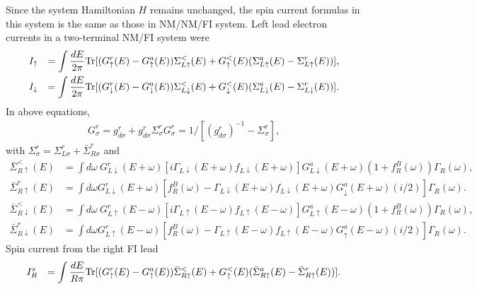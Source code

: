 \documentclass[aps,prb,superscriptaddress]{revtex4-2}
\begin{document}
Since the system Hamiltonian $H$ remains unchanged, the spin current formulas in this system is the same as those in NM/NM/FI system. Left lead electron currents in a two-terminal NM/FI system were
\begin{eqnarray}
I_{\uparrow} &&= \int \frac{dE}{2\pi} {\rm Tr} [(G_{\uparrow}^r(E)-G_{\uparrow}^a(E))\Sigma^<_{L\uparrow}(E)+G_{\uparrow}^<(E) (\Sigma_{L\uparrow}^a(E) -\Sigma_{L\uparrow}^r(E))],\\
I_{\downarrow} &&= \int \frac{dE}{2\pi} {\rm Tr} [(G_{\downarrow}^r(E)-G_{\downarrow}^a(E))\Sigma^<_{L\downarrow}(E)+G_{\downarrow}^<(E) (\Sigma_{L\downarrow}^a(E) -\Sigma_{L\downarrow}^r(E))].
\end{eqnarray}
In above equations, 
\begin{eqnarray}
G^r_{\sigma} =g^r_{d\sigma} + g^r_{d\sigma} \Sigma_{\sigma}^r G^r_{\sigma} = 1/[(g^r_{d\sigma})^{-1} - \Sigma_{\sigma}^r],
\end{eqnarray}
with $\Sigma_{\sigma}^r = \Sigma_{L\sigma}^r +  {\bar \Sigma}_{R\sigma}^r$ and
\begin{eqnarray}
{\bar \Sigma}^<_{R\uparrow}(E) &= \int d\omega ~ G^r_{L\downarrow}({E+\omega})[i \Gamma_{L\downarrow}({E+\omega}) f_{L\downarrow}({E+\omega})] G^a_{L\downarrow}({E+\omega})(1+f_R^B(\omega)) \Gamma_R(\omega),\label{eq:less} \\
{\bar \Sigma}^r_{R\uparrow}(E)&= \int d\omega G^r_{L\downarrow}({E+\omega})[f^B_R(\omega)-\Gamma_{L\downarrow}({E+\omega}) f_{L\downarrow}({E+\omega})G^a_{\downarrow}({E+\omega})(i/2)]\Gamma_R(\omega).\label{eq:rup}
\end{eqnarray}
\begin{eqnarray}
{\bar \Sigma}^<_{R\downarrow}(E) &= \int d\omega ~ G^r_{L\uparrow}({E-\omega})[i \Gamma_{L\uparrow}({E-\omega}) f_{L\uparrow}({E-\omega})] G^a_{L\uparrow}({E-\omega})(1+f_R^B(\omega)) \Gamma_R(\omega),\label{eq:less} \\
{\bar \Sigma}^r_{R\downarrow}(E)&= \int d\omega G^r_{L\uparrow}({E-\omega})[f^B_R(\omega)-\Gamma_{L\uparrow}({E-\omega}) f_{L\uparrow}({E-\omega})G^a_{\uparrow}({E-\omega})(i/2)]\Gamma_R(\omega).\label{eq:rdn}
\end{eqnarray}
Spin current from the right FI lead
\begin{eqnarray}
I_R^s &&= \int \frac{dE}{R\pi} {\rm Tr} [(G_{\uparrow}^r(E)-G_{\uparrow}^a(E))\bar\Sigma^<_{R\uparrow}(E)+G_{\uparrow}^<(E) (\bar\Sigma_{R\uparrow}^a(E) -\bar\Sigma_{R\uparrow}^r(E))].
\end{eqnarray}
\end{document}
